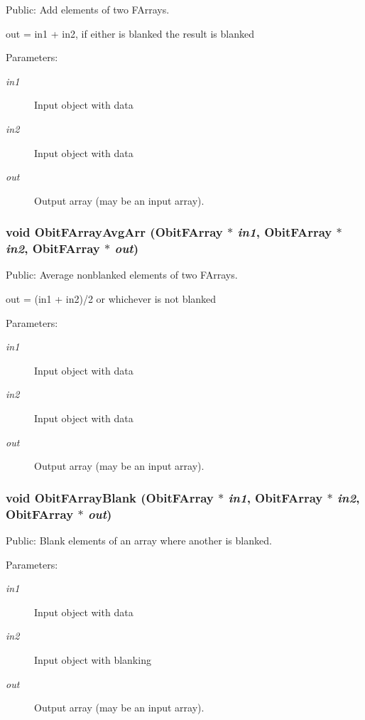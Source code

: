 Public: Add elements of two FArrays. 

out = in1 + in2, if either is blanked the result is blanked \begin{Desc}
\item[Parameters:]
\begin{description}
\item[{\em in1}]Input object with data \item[{\em in2}]Input object with data \item[{\em out}]Output array (may be an input array). \end{description}
\end{Desc}
\subsubsection{\setlength{\rightskip}{0pt plus 5cm}void Obit\-FArray\-Avg\-Arr ({\bf Obit\-FArray} $\ast$ {\em in1}, {\bf Obit\-FArray} $\ast$ {\em in2}, {\bf Obit\-FArray} $\ast$ {\em out})}\label{ObitFArray_8c_a51}


Public: Average nonblanked elements of two FArrays. 

out = (in1 + in2)/2 or whichever is not blanked \begin{Desc}
\item[Parameters:]
\begin{description}
\item[{\em in1}]Input object with data \item[{\em in2}]Input object with data \item[{\em out}]Output array (may be an input array). \end{description}
\end{Desc}
\subsubsection{\setlength{\rightskip}{0pt plus 5cm}void Obit\-FArray\-Blank ({\bf Obit\-FArray} $\ast$ {\em in1}, {\bf Obit\-FArray} $\ast$ {\em in2}, {\bf Obit\-FArray} $\ast$ {\em out})}\label{ObitFArray_8c_a47}


Public: Blank elements of an array where another is blanked. 

\begin{Desc}
\item[Parameters:]
\begin{description}
\item[{\em in1}]Input object with data \item[{\em in2}]Input object with blanking \item[{\em out}]Output array (may be an input array). \end{description}
\end{Desc}
